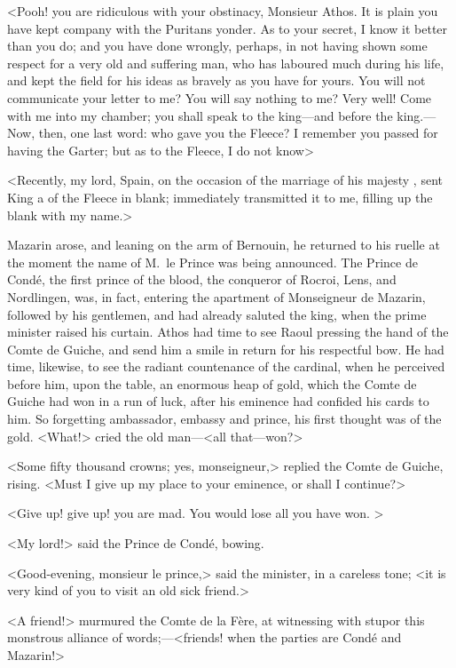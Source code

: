 <Pooh! you are ridiculous with your obstinacy, Monsieur Athos. It is plain you have kept company with the Puritans yonder. As to your secret, I know it better than you do; and you have done wrongly, perhaps, in not having shown some respect for a very old and suffering man, who has laboured much during his life, and kept the field for his ideas as bravely as you have for yours. You will not communicate your letter to me? You will say nothing to me? Very well! Come with me into my chamber; you shall speak to the king—and before the king.—Now, then, one last word: who gave you the Fleece? I remember you passed for having the Garter; but as to the Fleece, I do not know\longdash>

<Recently, my lord, Spain, on the occasion of the marriage of his majesty , sent King  a  of the Fleece in blank;  immediately transmitted it to me, filling up the blank with my name.>

Mazarin arose, and leaning on the arm of Bernouin, he returned to his ruelle at the moment the name of M.~le Prince was being announced. The Prince de Condé, the first prince of the blood, the conqueror of Rocroi, Lens, and Nordlingen, was, in fact, entering the apartment of Monseigneur de Mazarin, followed by his gentlemen, and had already saluted the king, when the prime minister raised his curtain. Athos had time to see Raoul pressing the hand of the Comte de Guiche, and send him a smile in return for his respectful bow. He had time, likewise, to see the radiant countenance of the cardinal, when he perceived before him, upon the table, an enormous heap of gold, which the Comte de Guiche had won in a run of luck, after his eminence had confided his cards to him. So forgetting ambassador, embassy and prince, his first thought was of the gold. <What!> cried the old man—<all that—won?>

<Some fifty thousand crowns; yes, monseigneur,> replied the Comte de Guiche, rising. <Must I give up my place to your eminence, or shall I continue?>

<Give up! give up! you are mad. You would lose all you have won. >

<My lord!> said the Prince de Condé, bowing.

<Good-evening, monsieur le prince,> said the minister, in a careless tone; <it is very kind of you to visit an old sick friend.>

<A friend!> murmured the Comte de la Fère, at witnessing with stupor this monstrous alliance of words;—<friends! when the parties are Condé and Mazarin!>

